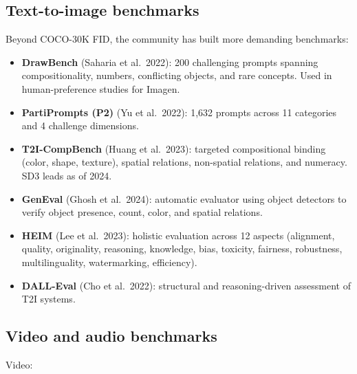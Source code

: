 \documentclass{article}
\begin{document}
\subsection{Text-to-image benchmarks}\label{text-to-image-benchmarks}

Beyond COCO-30K FID, the community has built more demanding benchmarks:

\begin{itemize}

\item
  \textbf{DrawBench} (Saharia et al.~2022): 200 challenging prompts spanning compositionality, numbers, conflicting objects, and rare concepts. Used in human-preference studies for Imagen.
\item
  \textbf{PartiPrompts (P2)} (Yu et al.~2022): 1,632 prompts across 11 categories and 4 challenge dimensions.
\item
  \textbf{T2I-CompBench} (Huang et al.~2023): targeted compositional binding (color, shape, texture), spatial relations, non-spatial relations, and numeracy. SD3 leads as of 2024.
\item
  \textbf{GenEval} (Ghosh et al.~2024): automatic evaluator using object detectors to verify object presence, count, color, and spatial relations.
\item
  \textbf{HEIM} (Lee et al.~2023): holistic evaluation across 12 aspects (alignment, quality, originality, reasoning, knowledge, bias, toxicity, fairness, robustness, multilinguality, watermarking, efficiency).
\item
  \textbf{DALL-Eval} (Cho et al.~2022): structural and reasoning-driven assessment of T2I systems.
\end{itemize}

\subsection{Video and audio benchmarks}\label{video-and-audio-benchmarks}

Video:
\end{document}
